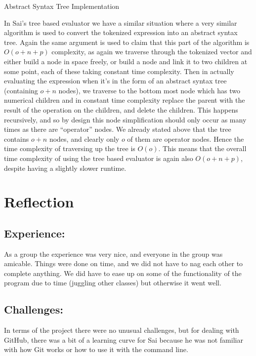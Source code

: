 \documentclass[11pt]{article}
\begin{document}
\centerline{Abstract Syntax Tree Implementation}
In Sai's tree based evaluator we have a similar situation where a very similar algorithm is used to convert the tokenized expression into an abstract syntax tree.
Again the same argument is used to claim that this part of the algorithm is $O(o+n+p)$ complexity, as again we traverse through the tokenized vector and either build a node in space freely, or build a node and link it to two children at some point, each of these taking constant time complexity.
Then in actually evaluating the expression when it's in the form of an abstract syntax tree (containing $o+n$ nodes), we traverse to the bottom most node which has two numerical children and in constant time complexity replace the parent with the result of the operation on the children, and delete the children.
This happens recursively, and so by design this node simplification should only occur as many times as there are ``operator'' nodes. We already stated above that the tree contains $o+n$ nodes, and clearly only $o$ of them are operator nodes. Hence the time complexity of traversing up the tree is $O(o)$. This means that the overall time complexity of using the tree based evaluator is again also $O(o+n+p)$, despite having a slightly slower runtime.

\noindent\makebox[\linewidth]{\rule{19.1cm}{0.4pt}}

\section*{Reflection}

\subsection*{Experience:}
As a group the experience was very nice, and everyone in the group was amicable. Things were done on time, and we did not have to nag each other to complete anything. We did have to ease up on some of the functionality of the program due to time (juggling other classes) but otherwise it went well.

\subsection*{Challenges:}
In terms of the project there were no unusual challenges, but for dealing with GitHub, there was a bit of a learning curve for Sai because he was not familiar with how Git works or how to use it with the command line.
\end{document}
